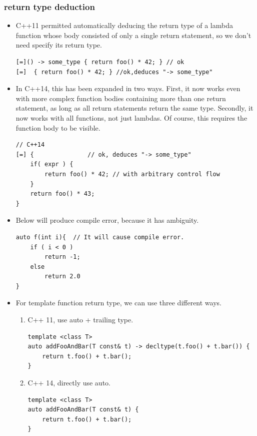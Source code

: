 \documentclass[a4paper,11pt,twoside]{book}
\begin{document}
\subsubsection{return type deduction}
\begin{itemize}
	\item C++11 permitted automatically deducing the return type of a lambda function whose body consisted of only a single return statement, so we don't need specify its return type.
\begin{lstlisting}[numbers=none]
[=]() -> some_type { return foo() * 42; } // ok
[=]  { return foo() * 42; } //ok,deduces "-> some_type"
\end{lstlisting}
	
	\item In C++14, this has been expanded in two ways. First, it now works even with more complex function bodies containing more than one return statement, as long as all return statements return the same type. Secondly, it now works with all functions, not just lambdas. Of course, this requires the function body to be visible.
\begin{lstlisting}
// C++14
[=] {               // ok, deduces "-> some_type"
	if( expr ) {
		return foo() * 42; // with arbitrary control flow
	}
	return foo() * 43; 
}                       
\end{lstlisting}
		
	\item Below will produce compile error, because it has ambiguity.
\begin{lstlisting}[numbers=none]
auto f(int i){  // It will cause compile error.
    if ( i < 0 )
    	return -1;
    else
    	return 2.0
}
\end{lstlisting}

	\item For template function return type, we can use three different ways.	
	\begin{enumerate}
		\item C++ 11, use auto + trailing type.
\begin{lstlisting}[numbers=none]
template <class T>
auto addFooAndBar(T const& t) -> decltype(t.foo() + t.bar()) {
    return t.foo() + t.bar();
}
\end{lstlisting}

\item C++ 14, directly use auto.
\begin{lstlisting}[numbers=none]
template <class T>
auto addFooAndBar(T const& t) {
    return t.foo() + t.bar();
}
\end{lstlisting}


\end{enumerate}
\end{itemize}
\end{document}
